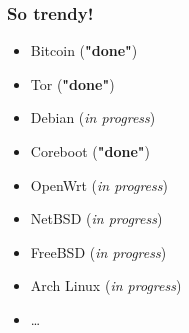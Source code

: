 \documentclass[14pt]{beamer}
\begin{document}
\begin{frame}
 \frametitle{So trendy!}

 \begin{itemize}
 \item Bitcoin (\textbf{"done"})
 \item Tor (\textbf{"done"})
 \item Debian (\emph{in progress})
 \item Coreboot (\textbf{"done"})
 \item OpenWrt (\emph{in progress})
 \item NetBSD (\emph{in progress})
 \item FreeBSD (\emph{in progress})
 \item Arch Linux (\emph{in progress})
 \item \ldots{}
\end{itemize}

\end{frame}


\begin{frame}[plain]
\end{frame}
\end{document}
